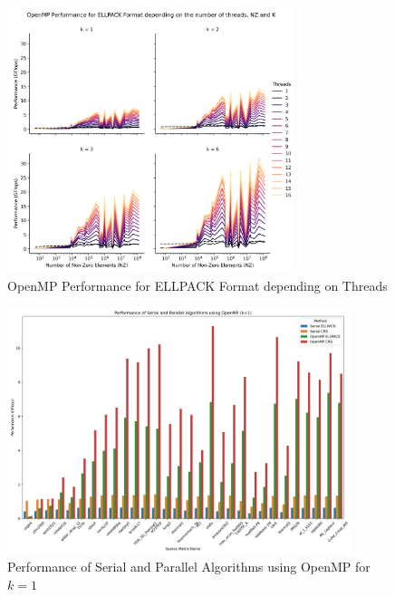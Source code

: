 \documentclass[12pt,oneside]{book} %
\begin{document}
\begin{figure}[H]
    \centering
    \includegraphics[width=0.75\textwidth]{../results/images/openMP_Threads_ELLPACK.png}
    \caption{OpenMP Performance for ELLPACK Format depending on Threads}
    \label{fig:openmpthreadsellpack}
\end{figure}

\newpage
\begin{figure}[H]
    \centering
    \includegraphics[width=0.9\textwidth]{../results/images/openMP_Performance_k1.png}
    \caption{Performance of Serial and Parallel Algorithms using OpenMP for $k=1$}
    \label{fig:openmp-performance-k1}
\end{figure}
\end{document}
